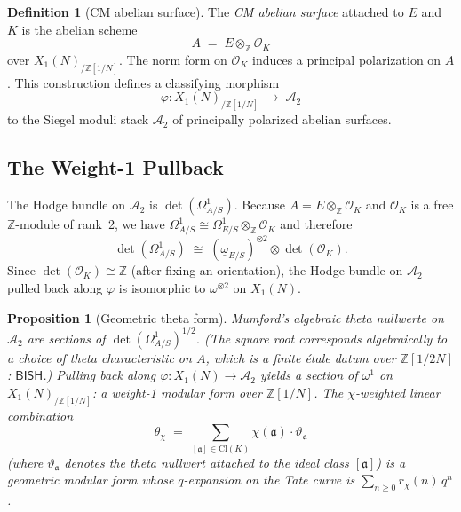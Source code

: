 \documentclass[11pt,a4paper]{article}
\theoremstyle{plain}
\newtheorem{proposition}[theorem]{Proposition}
\theoremstyle{definition}
\newtheorem{definition}[theorem]{Definition}
\newcommand{\BISH}{\textsf{BISH}}
\newcommand{\Z}{\mathbb{Z}}
\begin{document}
\begin{definition}[CM abelian surface]\label{def:cm-surface}
The \emph{CM abelian surface} attached to $E$ and $K$ is the abelian scheme
\[
A \;=\; E \otimes_{\Z} \mathcal{O}_K
\]
over $X_1(N)_{/\Z[1/N]}$. The norm form on $\mathcal{O}_K$ induces a principal polarization on $A$. This construction defines a classifying morphism
\[
\varphi : X_1(N)_{/\Z[1/N]} \;\longrightarrow\; \mathcal{A}_2
\]
to the Siegel moduli stack $\mathcal{A}_2$ of principally polarized abelian surfaces.
\end{definition}

\subsection{The Weight-1 Pullback}

The Hodge bundle on $\mathcal{A}_2$ is $\det(\Omega^1_{A/S})$.
Because $A = E \otimes_\Z \mathcal{O}_K$ and $\mathcal{O}_K$ is a free $\Z$-module of rank~2, we have $\Omega^1_{A/S} \cong \Omega^1_{E/S} \otimes_\Z \mathcal{O}_K$ and therefore
\[
\det(\Omega^1_{A/S}) \;\cong\; (\underline{\omega}_{E/S})^{\otimes 2} \otimes \det(\mathcal{O}_K).
\]
Since $\det(\mathcal{O}_K) \cong \Z$ (after fixing an orientation), the Hodge bundle on $\mathcal{A}_2$ pulled back along $\varphi$ is isomorphic to $\underline{\omega}^{\otimes 2}$ on $X_1(N)$.

\begin{proposition}[Geometric theta form]\label{prop:geometric-theta}
Mumford's algebraic theta nullwerte on $\mathcal{A}_2$ are sections of $\det(\Omega^1_{A/S})^{1/2}$.
(The square root corresponds algebraically to a choice of theta characteristic on $A$, which is a finite \'etale datum over $\Z[1/2N]$: $\BISH$.)
Pulling back along $\varphi : X_1(N) \to \mathcal{A}_2$ yields a section of $\underline{\omega}^{1}$ on $X_1(N)_{/\Z[1/N]}$: a weight-1 modular form over $\Z[1/N]$.
The $\chi$-weighted linear combination
\[
\theta_\chi \;=\; \sum_{[\mathfrak{a}] \in \mathrm{Cl}(K)} \chi(\mathfrak{a}) \cdot \vartheta_{\mathfrak{a}}
\]
(where $\vartheta_\mathfrak{a}$ denotes the theta nullwert attached to the ideal class $[\mathfrak{a}]$) is a geometric modular form whose $q$-expansion on the Tate curve is $\sum_{n \geq 0} r_\chi(n)\, q^n$.
\end{proposition}
\end{document}
